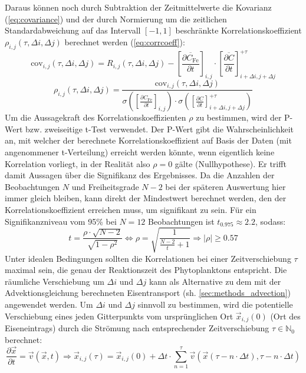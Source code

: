 \documentclass[12pt,a4paper,onecolumn,headheight=30pt]{scrartcl}
\begin{document}
Daraus können noch durch Subtraktion der Zeitmittelwerte die Kovarianz (\ref{eq:covariance}) und der durch Normierung um die zeitlichen Standardabweichung auf das Intervall $[-1,1]$ beschränkte Korrelationskoeffizient $\rho_{i,j}(\tau,\Delta i, \Delta j)$ berechnet werden (\ref{eq:corrcoeff}):
\begin{equation}
\text{cov}_{i,j}(\tau,\Delta i, \Delta j) = R_{i,j}(\tau,\Delta i, \Delta j)-\left[\frac{\overline{\partial C_\text{Fe}}}{\partial t}\right]_{i,j} \cdot \left[\frac{\overline{\partial C}}{\partial t}\right]_{i+\Delta i,j+\Delta j}^{+\tau} \label{eq:covariance}
\end{equation}
\begin{equation}
\rho_{i,j}(\tau,\Delta i, \Delta j) = \frac{\text{cov}_{i,j}(\tau,\Delta i, \Delta j)}{\sigma \left(\left[\frac{\partial C_\text{Fe}}{\partial t}\right]_{i,j}\right) \cdot \sigma\left(\left[\frac{\partial C}{\partial t}\right]_{i+\Delta i ,j+\Delta j}^{+\tau}\right)} \label{eq:corrcoeff}
\end{equation}
Um die Aussagekraft des Korrelationskoeffizienten $\rho$ zu bestimmen, wird der P-Wert bzw. zweiseitige t-Test verwendet. Der P-Wert gibt die Wahrscheinlichkeit an, mit welcher der berechnete Korrelationskoeffizient auf Basis der Daten (mit angenommener t-Verteilung) erreicht werden könnte, wenn eigentlich keine Korrelation vorliegt, in der Realität also $\rho=0$ gälte (Nullhypothese). Er trifft damit Aussagen über die Signifikanz des Ergebnisses. Da die Anzahlen der Beobachtungen $N$ und Freiheitsgrade $N-2$ bei der späteren Auswertung hier immer gleich bleiben, kann direkt der Mindestwert berechnet werden, den der Korrelationskoeffizient erreichen muss, um signifikant zu sein. Für ein Signifikanzniveau vom 95\% bei $N = 12$ Beobachtungen ist $t_{0.975}\approx 2.2$, sodass:
\begin{equation}
t = \frac{\rho \cdot \sqrt{N-2}}{\sqrt{1-\rho^2}} \Leftrightarrow \rho = \sqrt{\frac{1}{\frac{N-2}{t}+1}} \Rightarrow |\rho| \geq 0.57 
\end{equation}
Unter idealen Bedingungen sollten die Korrelationen bei einer Zeitverschiebung $\tau$ maximal sein, die genau der Reaktionszeit des Phytoplanktons entspricht. Die räumliche Verschiebung um $\Delta i$ und $\Delta j$ kann als Alternative zu dem mit der Advektionsgleichung berechneten Eisentransport (sh. \ref{sec:methods_advection}) angewendet werden. Um $\Delta i$ und $\Delta j$ sinnvoll zu bestimmen, wird die potentielle Verschiebung eines jeden Gitterpunkts vom ursprünglichen Ort $\vec{x}_{i,j}(0)$ (Ort des Eiseneintrags) durch die Strömung nach entsprechender Zeitverschiebung $\tau \in \mathbb{N}_0$ berechnet:
\begin{equation}
\frac{\partial \vec{x}}{\partial t} = \vec{v}(\vec{x},t) \Rightarrow \vec{x}_{i,j}(\tau) =   \vec{x}_{i,j}(0) + \Delta t \cdot \sum\limits_{n = 1}^{\tau} \vec{v} \left( \vec{x}(\tau - n \cdot \Delta t),\tau - n \cdot \Delta t \right) \label{eq:position_shift}
\end{equation}
\end{document}
